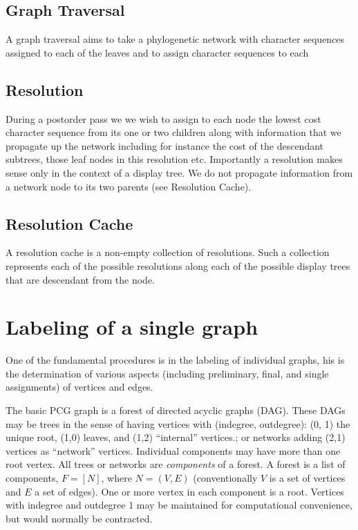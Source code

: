 \documentclass[12pt]{article}
\begin{document}
\subsection{Graph Traversal}

A graph traversal aims to take a phylogenetic network with character sequences assigned to each of the leaves and to assign character sequences to each

\subsection{Resolution}

During a postorder pass we we wish to assign to each node the lowest cost character sequence from its one or two children along with information that we propagate up the network including for instance the cost of the descendant subtrees, those leaf nodes in this resolution etc. 
Importantly a resolution makes sense only in the context of a display tree. 
We do not propagate information from a network node to its two parents (see Resolution Cache).

\subsection{Resolution Cache}

A resolution cache is a non-empty collection of resolutions. 
Such a collection represents each of the possible resolutions along each of the possible display trees that are descendant from the node.


\section{Labeling of a single graph} \label{Labelling of a single graph}
One of the fundamental procedures is in the labeling of individual graphs,  his is the determination of various aspects (including preliminary, final, and single assignments) of vertices and edges.   

The basic PCG graph is a forest of directed acyclic graphs (DAG). 
These DAGs may be trees in the sense of having vertices with (indegree, outdegree): (0, 1) the unique root, (1,0) leaves, and (1,2) ``internal'' vertices.; or networks adding (2,1) vertices as ``network'' vertices.
Individual components may have more than one root vertex.
All trees or networks are \textit{components} of a forest. 
A forest is a list of components, $F = [N]$, where $N = (V, E)$ (conventionally $V$ is a set of vertices and $E$ a set of edges).
One or more vertex in each component is a root. 
Vertices with indegree and outdegree 1 may be maintained for computational convenience, but would normally be contracted.
 
\end{document}
